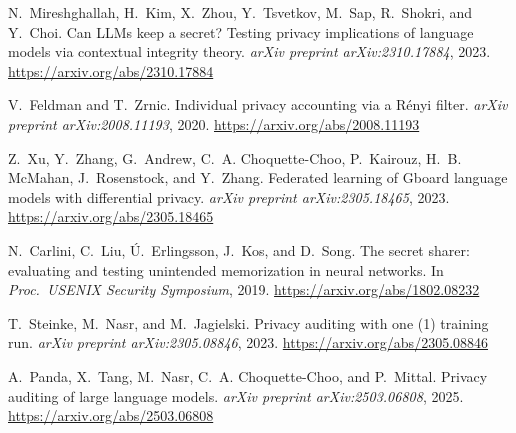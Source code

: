 N.~Mireshghallah, H.~Kim, X.~Zhou, Y.~Tsvetkov, M.~Sap,
R.~Shokri, and Y.~Choi. Can LLMs keep a secret? Testing privacy implications of language models
via contextual integrity theory. \emph{arXiv preprint arXiv:2310.17884}, 2023.
\url{https://arxiv.org/abs/2310.17884}

 V.~Feldman and T.~Zrnic. Individual privacy accounting via a R\'enyi
filter. \emph{arXiv preprint arXiv:2008.11193}, 2020. \url{https://arxiv.org/abs/2008.11193}

 Z.~Xu, Y.~Zhang, G.~Andrew, C.~A. Choquette-Choo, P.~Kairouz,
H.~B. McMahan, J.~Rosenstock, and Y.~Zhang. Federated learning of Gboard language models with
differential privacy. \emph{arXiv preprint arXiv:2305.18465}, 2023.
\url{https://arxiv.org/abs/2305.18465}

 N.~Carlini, C.~Liu, \'U.~Erlingsson, J.~Kos, and D.~Song. The secret
sharer: evaluating and testing unintended memorization in neural networks. In \emph{Proc.\ USENIX
Security Symposium}, 2019. \url{https://arxiv.org/abs/1802.08232}

 T.~Steinke, M.~Nasr, and M.~Jagielski. Privacy auditing with one (1)
training run. \emph{arXiv preprint arXiv:2305.08846}, 2023.
\url{https://arxiv.org/abs/2305.08846}

 A.~Panda, X.~Tang, M.~Nasr, C.~A. Choquette-Choo, and P.~Mittal.
Privacy auditing of large language models. \emph{arXiv preprint arXiv:2503.06808}, 2025.
\url{https://arxiv.org/abs/2503.06808}
